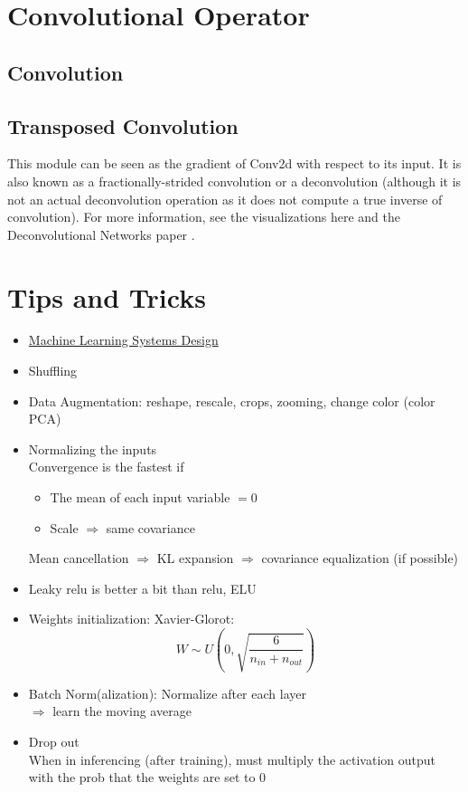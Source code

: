 \section{Convolutional Operator}
\subsection{Convolution}
\cite{lecun1998gradient}

\subsection{Transposed Convolution}
This module can be seen as the gradient of Conv2d with respect to its input. It is also known as a fractionally-strided convolution or a deconvolution (although it is not an actual deconvolution operation as it does not compute a true inverse of convolution). For more information, see the visualizations here \cite{dumoulin2016guide} and the Deconvolutional Networks paper \cite{zeiler2010deconvolutional}.

\section{Tips and Tricks}
\begin{itemize}
	\item \href{https://github.com/chiphuyen/machine-learning-systems-design}{Machine Learning Systems Design}
	\item Shuffling
	\item Data Augmentation: reshape, rescale, crops, zooming, change color (color \ac{PCA})
	\item Normalizing the inputs\\
	Convergence is the fastest if
	\begin{itemize}
		\item The mean of each input variable $=0$
		\item Scale $\Rightarrow$ same covariance
	\end{itemize}
	Mean cancellation $\Rightarrow$ \ac{KL} expansion $\Rightarrow$ covariance equalization (if possible)
	\item Leaky \ac{relu} is better a bit than \ac{relu}, ELU
	\item Weights initialization: Xavier-Glorot:
	\[ W \sim U\left(0, \sqrt{\frac{6}{n_{in} + n_{out}}}\right) \]
	\item Batch Norm(alization): Normalize after each layer\\
	$\Rightarrow$ learn the moving average
	\item Drop out\\
	\note When in inferencing (after training), must multiply the activation output with the \ac{prob} that the weights are set to 0
\end{itemize}